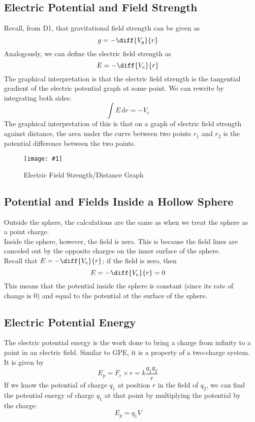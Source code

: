 \documentclass[a4paper,12pt]{article}
\newcommand{\lb}{\\[8pt]}
\newcommand{\img}[4]{\begin{center}
  \begin{figure}[H]
    \centering
    \texttt{[image: \#1]}
    \caption{#3}
    \label{fig:#4}
  \end{figure}
\end{center}}
\begin{document}
\pagebreak

\subsection{Electric Potential and Field Strength}
Recall, from D1, that gravitational field strength can be given as
$$g = -\diff{V_g}{r}$$
Analogously, we can define the electric field strength as
\begin{equation}\label{eq:potential2}
  E = -\diff{V_e}{r}
\end{equation}
The graphical interpretation is that the electric field strength is the tangential gradient of the electric potential graph at some point.
We can rewrite by integrating both sides:
$$
  \int E\,\mathrm{d}r = -V_e
$$
The graphical interpretation of this is that on a graph of electric field strength against distance, the area under the curve between two points $r_1$ and $r_2$ is the potential difference between the two points.
\img{Ergraph.png}{0.5}{Electric Field Strength/Distance Graph}{Ergraph}

\pagebreak

\subsection{Potential and Fields Inside a Hollow Sphere}

Outside the sphere, the calculations are the same as when we treat the sphere as a point charge.\lb
Inside the sphere, however, the field is zero. This is because the field lines are canceled out by the opposite charges on the inner surface of the sphere.\lb
Recall that $E = -\diff{V_e}{r}$; if the field is zero, then $$E = -\diff{V_e}{r} = 0$$
This means that the potential inside the sphere is constant (since its rate of change is 0) and equal to the potential at the surface of the sphere.

\pagebreak

\subsection{Electric Potential Energy}

The electric potential energy is the work done to bring a charge from infinity to a point in an electric field. Similar to GPE, it is a property of a two-charge system. It is given by
\begin{equation}\label{eq:epe}
  E_p = F_e\times r = k\frac{q_1q_2}{r}
\end{equation}
If we know the potential of charge $q_1$ at position $r$ in the field of $q_2$, we can find the potential energy of charge $q_1$ at that point by multiplying the potential by the charge:
\begin{equation}\label{eq:epe2}
  E_p = q_1V
\end{equation}
\end{document}
